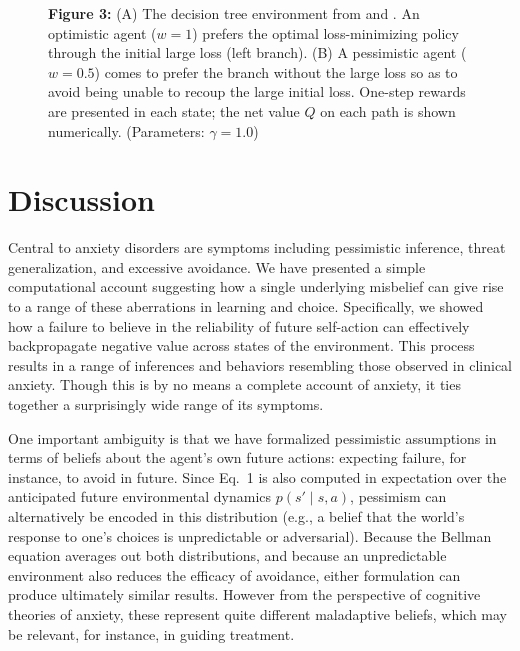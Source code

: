 \documentclass[11pt]{article} %
\begin{document}
\begin{figure}[!b]
  \centerline{%
  }
  \par \textbf{Figure 3:} (A) The decision tree environment from \cite{Huys2012} and \cite{Lally2017}. An optimistic agent ($w=1$) prefers the optimal loss-minimizing policy through the initial large loss (left branch). (B) A pessimistic agent ($w=0.5$) comes to prefer the branch without the large loss so as to avoid being unable to recoup the large initial loss. One-step rewards are presented in each state; the net value $Q$ on each path is shown numerically. (Parameters: $\gamma = 1.0$)
\end{figure}

\section{Discussion}

Central to anxiety disorders are symptoms including pessimistic inference, threat generalization, and excessive avoidance. We have presented a simple computational account suggesting how a single underlying misbelief can give rise to a range of these aberrations in learning and choice. Specifically, we showed how a failure to believe in the reliability of future self-action can effectively backpropagate negative value across states of the environment. This process results in a range of inferences and behaviors resembling those observed in clinical anxiety. Though this is by no means a complete account of anxiety, it ties together a surprisingly wide range of its symptoms.

One important ambiguity is that we have formalized pessimistic assumptions in terms of beliefs about the agent's own future actions: expecting failure, for instance, to avoid in future. Since Eq.~1 is also computed in expectation over the anticipated future environmental dynamics $p(s' \mid s,a)$, pessimism can alternatively be encoded in this distribution (e.g., a belief that the world's response to one's choices is unpredictable or adversarial). Because the Bellman equation averages out both distributions, and because an unpredictable environment also reduces the efficacy of avoidance, either formulation can produce ultimately similar results. However from the perspective of cognitive theories of anxiety, these represent quite different maladaptive beliefs, which may be relevant, for instance, in guiding treatment.
\end{document}
